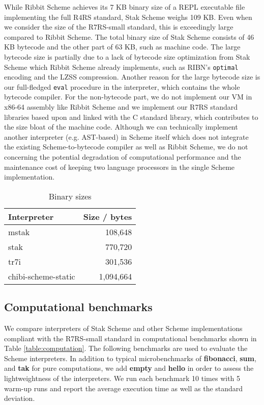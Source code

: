 \documentclass[sigplan]{acmart}
\begin{document}
While Ribbit Scheme \cite{ribbit7kb2023} achieves its 7 KB binary size
of a REPL executable file implementing the full R4RS standard, Stak
Scheme weighs 109 KB.
Even when we consider the size of the R7RS-small standard, this is
exceedingly large compared to Ribbit Scheme.
The total binary size of Stak Scheme consists of 46 KB bytecode and
the other part of 63 KB, such as machine code.
The large bytecode size is partially due to a lack of
bytecode size optimization from Stak Scheme which Ribbit Scheme already
implements, such as RIBN's \texttt{optimal} encoding and the
LZSS compression.
Another reason for the large bytecode size is our full-fledged
\texttt{eval} procedure in the interpreter, which contains the
whole bytecode compiler.
For the non-bytecode part, we do not implement our VM in x86-64
assembly like Ribbit Scheme and we implement our R7RS standard libraries
based upon and linked with the C standard library,
which contributes to the size bloat of the machine code.
Although we can technically implement another interpreter
(e.g. AST-based) in Scheme itself which does not integrate the
existing Scheme-to-bytecode compiler as well as Ribbit Scheme,
we do not concerning the potential degradation of
computational performance and the maintenance cost of keeping two
language processors in the single Scheme implementation.

\begin{table}
  \begin{center}
    \begin{tabular}{l|r}
      \hline
      Interpreter & Size / bytes \\
      \hline
      mstak & 108,648 \\
      stak & 770,720 \\
      tr7i & 301,536 \\
      chibi-scheme-static & 1,094,664 \\
      \hline
    \end{tabular}

    \caption{Binary sizes}
    \label{table:binary}
  \end{center}
\end{table}

\subsection{Computational benchmarks}

We compare interpreters of Stak Scheme and other Scheme
implementations compliant with the R7RS-small standard in computational
benchmarks shown in Table \ref{table:computation}.
The following benchmarks are used to evaluate the Scheme interpreters.
In addition to typical microbenchmarks of \textbf{fibonacci},
\textbf{sum}, and \textbf{tak} for pure computations, we add
\textbf{empty} and \textbf{hello} in order to assess the
lightweightness of the interpreters.
We run each benchmark 10 times with 5 warm-up runs and report the
average execution time as well as the standard deviation.
\end{document}
